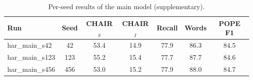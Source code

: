\begin{table}[t]
\centering
\small
\caption{Per-seed results of the main model (supplementary).}
\label{tab:seeds}
\begin{tabular}{lcccccc}
\toprule
Run & Seed & CHAIR$_S$ & CHAIR$_I$ & Recall & Words & POPE F1 \\
\midrule
har\_main\_s42 & 42 & 53.4 & 14.9 & 77.9 & 86.3 & 84.5 \\
har\_main\_s123 & 123 & 55.2 & 15.4 & 77.7 & 87.7 & 84.6 \\
har\_main\_s456 & 456 & 53.0 & 15.2 & 77.9 & 88.0 & 84.7 \\
\bottomrule
\end{tabular}
\end{table}
